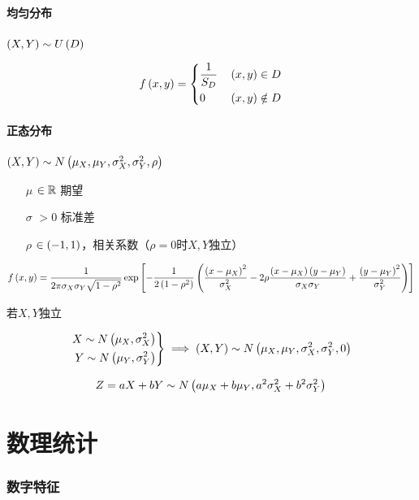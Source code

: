 \documentclass{article}
\begin{document}
\subsection{均匀分布}

$\left(X,Y\right)\sim U\left(D\right)$

\[f\left(x,y\right)=\left\{\begin{aligned}
         & \frac1{S_D} &  & \left(x,y\right)\in D    \\
         & 0           &  & \left(x,y\right)\notin D \\
    \end{aligned}\right.\]

\subsection{正态分布}

$\left(X,Y\right)\sim N\left(\mu_X,\mu_Y,\sigma_X^2,\sigma_Y^2,\rho\right)$

\begin{enumerate}
    \item [$\mu$] $\in\mathbb R$ 期望
    \item [$\sigma$] $>0$ 标准差
    \item [$\rho$] $\in\left(-1,1\right)$，相关系数（$\rho=0$时$X,Y$独立）
\end{enumerate}

\[f\left(x,y\right)=\frac1{2\pi\sigma_X\sigma_Y\sqrt{1-\rho^2}}
    \exp\left[-\frac1{2\left(1-\rho^2\right)}
        \left(\frac{{\left(x-\mu_X\right)}^2}{\sigma_X^2}
            -2\rho\frac{\left(x-\mu_X\right)\left(y-\mu_Y\right)}{\sigma_X\sigma_Y}
            +\frac{{\left(y-\mu_Y\right)}^2}{\sigma_Y^2}\right)\right]\]

若$X,Y$独立

\[\left.\begin{aligned}
        X\sim N\left(\mu_X,\sigma_X^2\right) \\
        Y\sim N\left(\mu_Y,\sigma_Y^2\right)
    \end{aligned}\right\}\implies
    \left(X,Y\right)\sim N\left(\mu_X,\mu_Y,\sigma_X^2,\sigma_Y^2,0\right)\]


\[Z=aX+bY\sim N\left(a\mu_X+b\mu_Y,a^2\sigma_X^2+b^2\sigma_Y^2\right)\]

\part{数理统计}

\section{数字特征}
\end{document}

